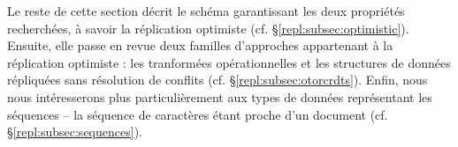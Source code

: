 Le reste de cette section décrit le schéma garantissant les deux propriétés
recherchées, à savoir la réplication optimiste (cf. §\ref{repl:subsec:optimistic}).
Ensuite, elle passe en revue deux familles d'approches appartenant à la
réplication optimiste : les tranformées opérationnelles et les structures de
données répliquées sans résolution de conflits
(cf. §\ref{repl:subsec:otorcrdts}). Enfin, nous nous intéresserons plus
particulièrement aux types de données représentant les séquences -- la séquence
de caractères étant proche d'un document (cf. §\ref{repl:subsec:sequences}). 






